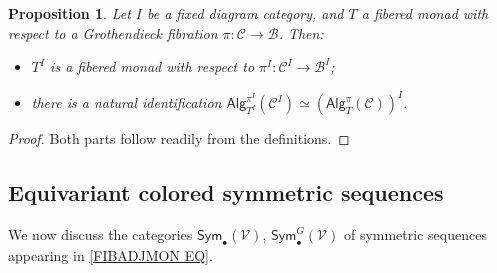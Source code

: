 \documentclass[a4paper,10pt
,draft
]{article}%
\numberwithin{equation}{section}
\numberwithin{figure}{section}
\newtheorem{proposition}[equation]{Proposition}%
\theoremstyle{definition} %
\newcommand{\V}{\ensuremath{\mathcal V}}
\newcommand{\1}{\ensuremath{\mathbbm 1}}%
\begin{document}
\begin{proposition}\label{DIAGRAMFM_PROP}
Let $I$ be a fixed diagram category, and $T$ a fibered monad with respect to a Grothendieck fibration 
$\pi \colon \mathcal{C} \to \mathcal{B}$. Then:
\begin{itemize}
\item[(i)] $T^I$ is a fibered monad with respect to $\pi^I\colon \mathcal{C}^I \to \mathcal{B}^I$;
\item[(ii)] there is a natural identification 
$\mathsf{Alg}_{T^I}^{\pi^I}(\mathcal{C}^I)
\simeq
\left(\mathsf{Alg}_T^{\pi}(\mathcal{C})\right)^I$.
\end{itemize}
\end{proposition}

\begin{proof}
Both parts follow readily from the definitions.
\end{proof}






\subsection{Equivariant colored symmetric sequences}
\label{EQCOSYMSEQ SEC}

We now discuss the categories
$\mathsf{Sym}_{\bullet}(\V)$,
$\mathsf{Sym}^G_{\bullet}(\V)$
of symmetric sequences appearing in \eqref{FIBADJMON EQ}.
\end{document}
